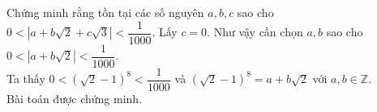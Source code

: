 \begin{ex}%
    Chứng minh rằng tồn tại các số nguyên $a,b,c$ sao cho $0<\left|a+b\sqrt{2}+c\sqrt{3}\right|<\dfrac{1}{1000}$.
\loigiai
    {
    	Lấy $c=0$. Như vậy cần chọn $a,b$ sao cho $0<\left|a+b\sqrt{2}\right|<\dfrac{1}{1000}$.\\
    	Ta thấy $0< (\sqrt{2}-1)^8 < \dfrac{1}{1000}$ và $(\sqrt{2}-1)^8 = a + b\sqrt{2}$ với $a,b\in \mathbb{Z}$.\\
    	Bài toán được chứng minh.
    }
\end{ex}

